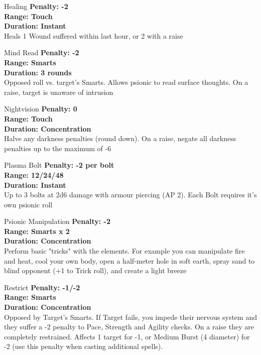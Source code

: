 \begin{multicols}{2}
\begin{genericsection}{Healing}
\textbf{Penalty: -2}\\
\textbf{Range: Touch}\\
\textbf{Duration: Instant}\\
Heals 1 Wound suffered within last hour, or 2 with a raise
\end{genericsection}

\begin{genericsection}{Mind Read}
\textbf{Penalty: -2}\\
\textbf{Range: Smarts}\\
\textbf{Duration: 3 rounds}\\
Opposed roll vs. target's Smarts. Allows psionic to read surface thoughts. On a raise, target is unaware of intrusion
\end{genericsection}

\begin{genericsection}{Nightvision}
\textbf{Penalty: 0}\\
\textbf{Range: Touch}\\
\textbf{Duration: Concentration}\\
Halve any darkness penalties (round down). On a raise, negate all darkness penalties up to the maximum of -6
\end{genericsection}

\begin{genericsection}{Plasma Bolt}
\textbf{Penalty: -2 per bolt}\\
\textbf{Range: 12/24/48}\\
\textbf{Duration: Instant}\\
Up to 3 bolts at 2d6 damage with armour piercing (AP 2). Each Bolt requires it's own psionic roll
\end{genericsection}

\begin{genericsection}{Psionic Manipulation}
\textbf{Penalty: -2}\\
\textbf{Range: Smarts x 2}\\
\textbf{Duration: Concentration}\\
Perform basic "tricks" with the elements. For example you can manipulate fire and heat, cool your own body, open a half-meter hole in soft earth, spray sand to blind opponent (+1 to Trick roll), and create a light breeze
\end{genericsection}

\begin{genericsection}{Restrict}
\textbf{Penalty: -1/-2}\\
\textbf{Range: Smarts}\\
\textbf{Duration: Concentration}\\
Opposed by Target's Smarts. If Target fails, you impede their nervous system and they suffer a -2 penalty to Pace, Strength and Agility checks. On a raise they are completely restrained. Affects 1 target for -1, or Medium Burst (4 diameter) for -2 (use this penalty when casting additional spells).
\end{genericsection}


\end{multicols}
